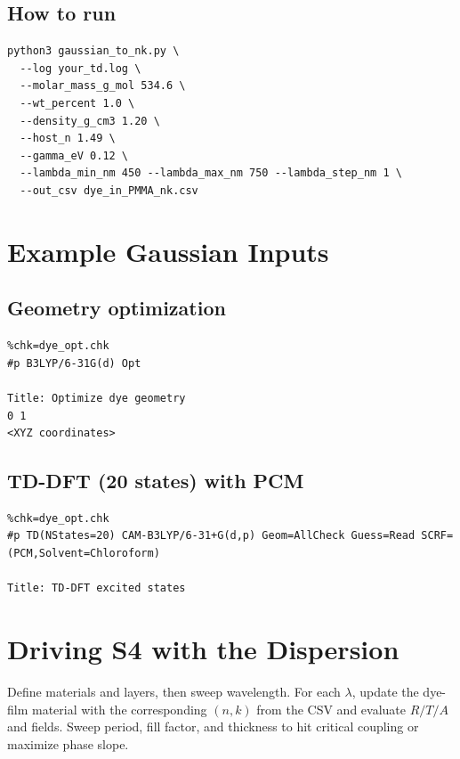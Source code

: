 \documentclass[11pt,a4paper]{article}
\begin{document}
\subsection*{How to run}
\begin{verbatim}
python3 gaussian_to_nk.py \
  --log your_td.log \
  --molar_mass_g_mol 534.6 \
  --wt_percent 1.0 \
  --density_g_cm3 1.20 \
  --host_n 1.49 \
  --gamma_eV 0.12 \
  --lambda_min_nm 450 --lambda_max_nm 750 --lambda_step_nm 1 \
  --out_csv dye_in_PMMA_nk.csv
\end{verbatim}

\section{Example Gaussian Inputs}

\subsection*{Geometry optimization}
\begin{verbatim}
%chk=dye_opt.chk
#p B3LYP/6-31G(d) Opt

Title: Optimize dye geometry
0 1
<XYZ coordinates>
\end{verbatim}

\subsection*{TD-DFT (20 states) with PCM}
\begin{verbatim}
%chk=dye_opt.chk
#p TD(NStates=20) CAM-B3LYP/6-31+G(d,p) Geom=AllCheck Guess=Read SCRF=(PCM,Solvent=Chloroform)

Title: TD-DFT excited states
\end{verbatim}

\section{Driving S4 with the Dispersion}
Define materials and layers, then sweep wavelength. For each $\lambda$, update the dye-film material with the corresponding $(n,k)$ from the CSV and evaluate $R/T/A$ and fields. Sweep period, fill factor, and thickness to hit critical coupling or maximize phase slope.
\end{document}
